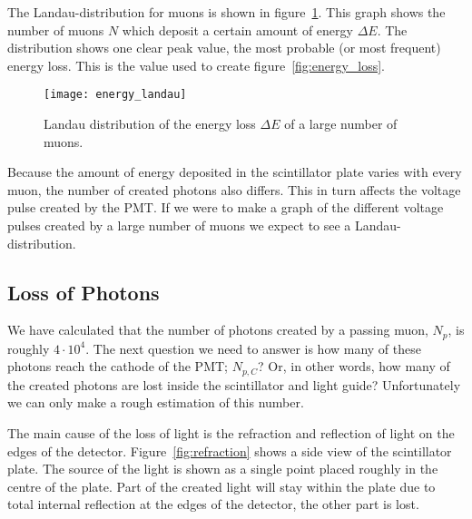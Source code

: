 The Landau-distribution for muons is shown in figure~\ref{fig:energy_landau}. This graph shows the number of muons $N$ which deposit a certain amount of energy $\Delta E$. The distribution shows one clear peak value, the most probable (or most frequent) energy loss. This is the value used to create figure~\ref{fig:energy_loss}.

\begin{figure}[b]\begin{center}
\texttt{[image: energy\_landau]}%
\caption{Landau distribution of the energy loss $\Delta E$ of a large number of muons.}\label{fig:energy_landau}
\end{center}\end{figure}

Because the amount of energy deposited in the scintillator plate varies with every muon, the number of created photons also differs. This in turn affects the voltage pulse created by the PMT. If we were to make a graph of the different voltage pulses created by a large number of muons we expect to see a Landau-distribution.

\subsection{Loss of Photons}
We have calculated that the number of photons created by a passing muon, $N_p$, is roughly $4 \cdot 10^4$. The next question we need to answer is how many of these photons reach the cathode of the PMT; $N_{p,C}$? Or, in other words, how many of the created photons are lost inside the scintillator and light guide? Unfortunately we can only make a rough estimation of this number.

The main cause of the loss of light is the refraction and reflection of light on the edges of the detector. Figure~\ref{fig:refraction} shows a side view of the scintillator plate. The source of the light is shown as a single point placed roughly in the centre of the plate. Part of the created light will stay within the plate due to total internal reflection at the edges of the detector, the other part is lost.

